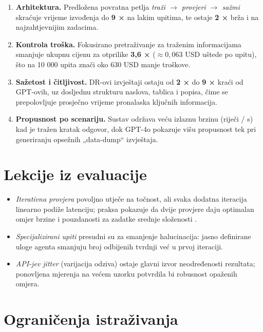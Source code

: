\documentclass[zavrsnirad]{fer}
\begin{document}
\begin{enumerate}[label=\arabic*.]
  \item \textbf{Arhitektura.}  Predložena povratna petlja
        \emph{traži $\rightarrow$ provjeri $\rightarrow$ sažmi}
        skraćuje vrijeme izvođenja do \textbf{9 ×} na lakim upitima,
        te ostaje \textbf{2 ×} brža i na najzahtjevnijim zadacima.
  \item \textbf{Kontrola troška.} Fokusirano pretraživanje za traženim informacijama               smanjuje ukupnu cijenu za otprilike \textbf{3,6 ×}
        ($\approx 0,063$ USD uštede po upitu), što na 10 000 upita
        znači oko 630 USD manje troškove.
  \item \textbf{Sažetost i čitljivost.}  DR-ovi izvještaji ostaju
        od \textbf{2 ×} do \textbf{9 ×} kraći od GPT-ovih, uz dosljednu
        strukturu naslova, tablica i popisa, čime se prepolovljuje
        prosječno vrijeme pronalaska ključnih informacija.
  \item \textbf{Propusnost po scenariju.}  Sustav održava veću
        izlaznu brzinu (riječi / s) kad je tražen kratak odgovor,
        dok GPT-4o pokazuje višu propusnost tek pri
        generiranju opsežnih „data-dump“ izvještaja.
\end{enumerate}

\section{Lekcije iz evaluacije}

\begin{itemize}[nosep]
  \item \emph{Iterativna provjera} povoljno utječe na točnost, ali
        svaka dodatna iteracija linearno podiže latenciju; praksa
        pokazuje da dvije provjere daju optimalan omjer brzine i
        pouzdanosti za zadatke srednje složenosti \cite{anthropic2024}.
  \item \emph{Specijalizirani upiti} presudni su za smanjenje
        halucinacija: jasno definirane uloge agenta
        smanjuju broj odbijenih tvrdnji već u prvoj iteraciji.
  \item \emph{API-jev jitter} (varijacija odziva) ostaje glavni izvor
        neodređenosti rezultata; ponovljena mjerenja na većem uzorku
        potvrdila bi robusnost opaženih omjera.
\end{itemize}

\section{Ograničenja istraživanja}
\end{document}
